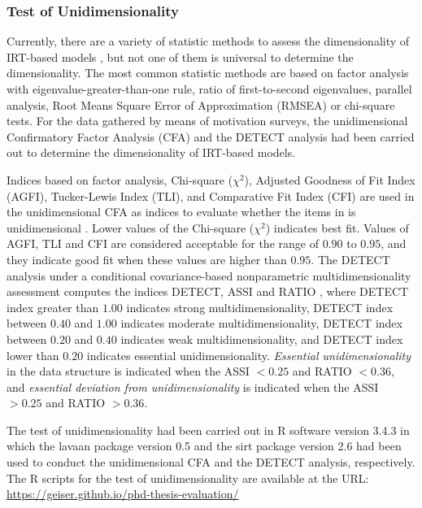 \subsubsection*{Test of Unidimensionality}

Currently, there are a variety of statistic methods to assess the dimensionality of IRT-based models \cite{Hattie1985, NandakumarYuLiStout1998}, but not one of them is universal to determine the dimensionality. The most common statistic methods are based on factor analysis with eigenvalue-greater-than-one rule, ratio of first-to-second eigenvalues, parallel analysis, Root Means Square Error of Approximation (RMSEA) or chi-square tests. For the data gathered by means of motivation surveys, the unidimensional Confirmatory Factor Analysis (CFA) \cite{Brown2014} and the DETECT analysis \cite{StoutHabingDouglasKimRoussosZhang1996, Zhang2004} had been carried out to determine the dimensionality of IRT-based models.

Indices based on factor analysis, Chi-square (${\chi}^2$), Adjusted Goodness of Fit Index (AGFI), Tucker-Lewis Index (TLI), and Comparative Fit Index (CFI) are used in the unidimensional CFA as indices to evaluate whether the items in  is unidimensional \cite{Brown2014}. Lower values of the Chi-square (${\chi}^2$) indicates best fit. Values of AGFI, TLI and CFI are considered acceptable for the range of $0.90$ to $0.95$, and they indicate good fit when these values are higher than $0.95$. The DETECT analysis under a conditional covariance-based nonparametric multidimensionality assessment computes the indices DETECT, ASSI and RATIO \cite{Zhang2007}, where DETECT index greater than $1.00$ indicates strong multidimensionality, DETECT index between $0.40$ and $1.00$ indicates moderate multidimensionality, DETECT index between $0.20$ and $0.40$ indicates weak multidimensionality, and DETECT index lower than $0.20$ indicates essential unidimensionality. \emph{Essential unidimensionality} in the data structure is indicated when the ASSI $< 0.25$ and RATIO $< 0.36$, and \emph{essential deviation from unidimensionality} is indicated when the ASSI $> 0.25$ and RATIO $> 0.36$.

The test of unidimensionality had been carried out in R software version 3.4.3 \cite{RCoreTeam2017} in which the lavaan package version 0.5 \cite{Rosseel2012} and the sirt package version 2.6 \cite{Robitzsch2018} had been used to conduct the unidimensional CFA and the DETECT analysis, respectively. The R scripts for the test of unidimensionality are available at the URL: \url{https://geiser.github.io/phd-thesis-evaluation/}

